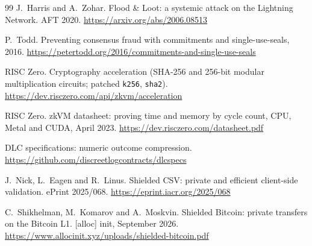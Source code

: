 \documentclass[11pt]{article}
\begin{document}
\begin{thebibliography}{99}
 J.~Harris and A.~Zohar. Flood \& Loot: a systemic attack on the Lightning Network. AFT 2020. \url{https://arxiv.org/abs/2006.08513}

 P.~Todd. Preventing consensus fraud with commitments and single-use-seals, 2016. \url{https://petertodd.org/2016/commitments-and-single-use-seals}

 RISC Zero. Cryptography acceleration (SHA-256 and 256-bit modular multiplication circuits; patched \texttt{k256}, \texttt{sha2}). \url{https://dev.risczero.com/api/zkvm/acceleration}

 RISC Zero. zkVM datasheet: proving time and memory by cycle count, CPU, Metal and CUDA, April 2023. \url{https://dev.risczero.com/datasheet.pdf}

 DLC specifications: numeric outcome compression. \url{https://github.com/discreetlogcontracts/dlcspecs}

 J.~Nick, L.~Eagen and R.~Linus. Shielded CSV: private and efficient client-side validation. ePrint 2025/068. \url{https://eprint.iacr.org/2025/068}

 C.~Shikhelman, M.~Komarov and A.~Moskvin. Shielded Bitcoin: private transfers on the Bitcoin L1. [alloc] init, September 2026. \url{https://www.allocinit.xyz/uploads/shielded-bitcoin.pdf}

\end{thebibliography}
\end{document}
